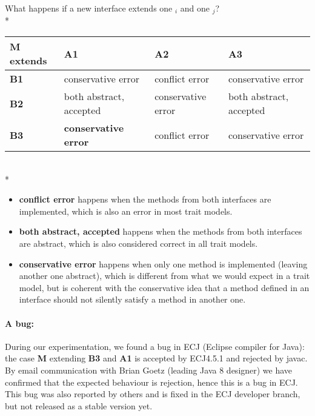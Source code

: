 \noindent
What happens if a new interface \Q@M@ extends one \Q@A@${}_i$ and one
\Q@B@${}_j$?\\*
\noindent
\begin{tabular}{|l|l|l|l|}
\hline
\textbf{M extends} & \textbf{A1}                  & \textbf{A2} & \textbf{A3} \\ \hline
\textbf{B1}        & conservative error                        & conflict error      & conservative error       \\ \hline
\textbf{B2}        & both abstract, accepted                        & conservative error       & both abstract, accepted       \\ \hline
\textbf{B3}        & \textbf{conservative error} &conflict  error       & conservative error      \\ \hline
\end{tabular}
\\*
\begin{itemize}
\item \textbf{conflict error} happens when the methods from both interfaces are implemented, which is also an error in most trait models.
\item \textbf{both abstract, accepted} happens when the methods from both interfaces are abstract, which is also considered correct in all
  trait models.
\item \textbf{conservative error} happens when only one method is implemented
  (leaving another one abstract), which is different from what we would expect in
  a trait model, but is coherent with the conservative idea that a method
  defined in an interface should not silently satisfy a method in another one.
\end{itemize}

\paragraph{A bug:} During our experimentation, we found a bug in ECJ (Eclipse compiler for Java):
the case \textbf{M} extending \textbf{B3} and \textbf{A1} is accepted by
ECJ4.5.1 and rejected by javac.  By email communication with Brian Goetz
(leading Java 8 designer) we have confirmed that the expected behaviour is
rejection, hence this is a bug in ECJ. This bug was also reported by
  others and is fixed in the ECJ developer branch, but not released as a stable
  version yet.

